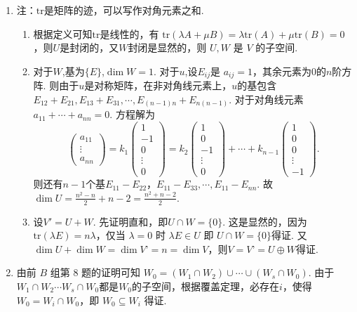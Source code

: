 \begin{enumerate}
    \item 注：$\text{tr}$是矩阵的迹，可以写作对角元素之和.
	\begin{enumerate}
        \item 根据定义可知$\text{tr}$是线性的，有 $\text{tr}(\lambda A+\mu B)=\lambda\text{tr}(A)+\mu\text{tr}(B)=0$，则$U$是封闭的，又$W$封闭是显然的，则 $U,W$ 是 $V$ 的子空间.
        \item 对于$W$,基为$\{E\}$,$\dim W=1$. 对于$u$,设$E_{ij}$是 $a_{ij}=1$，其余元素为$0$的$n$阶方阵. 则由于$u$是对称矩阵，在非对角线元素上，$u$的基包含$E_{12}+E_{21},E_{13}+E_{31},\cdots ,E_{(n-1)n}+E_{n(n-1)}$. 对于对角线元素 $a_{11}+\cdots +a_{nn}=0$. 方程解为
        \[\begin{pmatrix}a_{11}\\ \vdots\\ a_{nn}	\end{pmatrix}=k_1\begin{pmatrix}1 \\ -1 \\ 0\\ \vdots \\0	\end{pmatrix}=k_2\begin{pmatrix}1 \\ 0 \\ -1\\ \vdots \\0	\end{pmatrix}+\cdots+k_{n-1}\begin{pmatrix}1 \\ 0 \\ 0\\ \vdots \\-1	\end{pmatrix}.\]
        则还有$n-1$个基$E_{11}-E_{22}，E_{11}-E_{33},\cdots ,E_{11}-E_{nn}$. 故 $\dim U=\frac{n^2-n}2+n-2=\frac{n^2+n-2}2$.
        \item 设$V'=U+W$. 先证明直和，即$U\cap W=\{0\}$. 这是显然的，因为$\text{tr}(\lambda E)=n\lambda$，仅当 $\lambda=0$ 时 $\lambda E\in U$ 即 $U\cap W=\{0\}$得证. 又$\dim U+\dim W=\dim V’=n=\dim V$，则$V=V’=U\oplus W$得证.
    \end{enumerate}
    \item 由前 $B$ 组第 $8$ 题的证明可知 $W_0=(W_1\cap W_2)\cup\cdots\cup(W_s\cap W_0)$. 由于$W_1\cap W_2\cdots W_s\cap W_0$都是$W_0$的子空间，根据覆盖定理，必存在$i$，使得$W_0=W_i\cap W_0$，即 $W_0\subseteq W_i$ 得证.
\end{enumerate}

\clearpage
